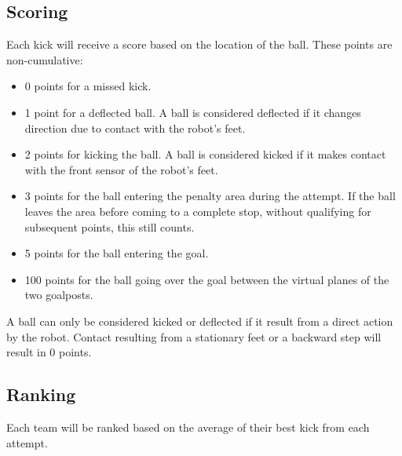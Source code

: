 \subsection{Scoring}

Each kick will receive a score based on the location of the ball.
These points are non-cumulative: 

\begin{itemize}
	\item 0 points for a missed kick.
	\item 1 point for a deflected ball.
	A ball is considered deflected if it changes direction due to contact with the robot's feet.
	\item 2 points for kicking the ball.
	A ball is considered kicked if it makes contact with the front sensor of the robot's feet.
	\item 3 points for the ball entering the penalty area during the attempt. 
	If the ball leaves the area before coming to a complete stop, without qualifying for subsequent points, this still counts. 
	\item 5 points for the ball entering the goal. 
	\item 100 points for the ball going over the goal between the virtual planes of the two goalposts. 
  \end{itemize}

  A ball can only be considered kicked or deflected if it result from a direct action by the robot.
  Contact resulting from a stationary feet or a backward step will result in 0 points.

  \subsection{Ranking}

  Each team will be ranked based on the average of their best kick from each attempt.